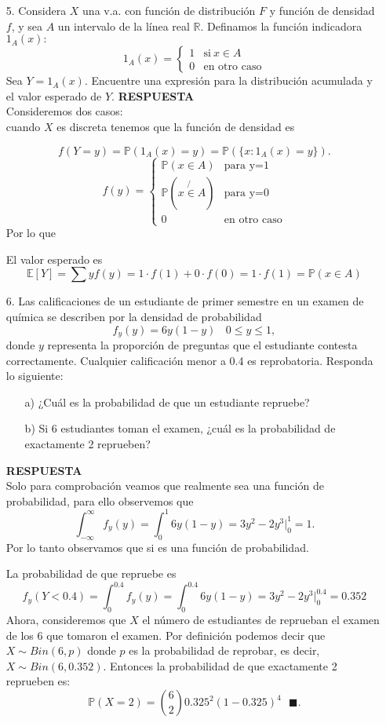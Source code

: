 \documentclass[11pt,letterpaper]{article}
\newcommand{\mP}{\mathbb{P}}
\newcommand{\mE}{\mathbb{E}}
\newcommand{\res}{\textbf{RESPUESTA}\\}
\newcommand{\finf}{\blacksquare.}
\begin{document}
\begin{itemize}
\item[5.] Considera $X$ una v.a. con función de distribución $F$ y función de densidad $f$, y sea $A$ un intervalo de la línea real $\mathbb{R}$. Definamos la función indicadora $1_{A}(x):$
\begin{equation*}
1_{A}(x) = \left\{\begin{array}{ccr}
1 & \text{si} \ x\in A\\
0 & \text{en otro caso}
\end{array}\right.
\end{equation*}
Sea $Y=1_{A}(x).$ Encuentre una expresión para la distribución acumulada y el valor esperado de $Y$. 
\res 
Consideremos dos casos:\\
cuando $X$ es discreta tenemos que la función de densidad es 

$$f(Y=y)=\mP(1_{A}(x)=y)=\mP(\{x:1_{A}(x)=y\}).$$
\begin{equation*}
f(y)=\left\{ \begin{array}{cc}
\mP(x\in A) & \text{para y=1}\\
\mP(x\not{\in} A) & \text{para y=0}\\
0 & \text{en otro caso}
\end{array}\right.
\end{equation*}
Por lo que 

El valor esperado es
$$\mE[Y]=\sum y f(y)=1\cdot f(1)+0\cdot f(0)=1\cdot f(1)=\mP(x\in A)$$

\item[6.] Las calificaciones de un estudiante de primer semestre en un examen de química se describen
por la densidad de probabilidad
$$f_y(y)=6y(1-y)\ \ \ \ 0\leq y \leq 1,$$
donde $y$ representa la proporción de preguntas que el estudiante contesta correctamente. Cualquier calificación menor a 0.4 es reprobatoria. Responda lo siguiente:
\begin{itemize}
\item[a)] ¿Cuál es la probabilidad de que un estudiante repruebe?
\item[b)] Si 6 estudiantes toman el examen, ¿cuál es la probabilidad de exactamente 2 reprueben?
\end{itemize}
\res
Solo para comprobación veamos que realmente sea una función de probabilidad, para ello observemos que
$$\int_{-\infty}^\infty f_y(y)=\int_{0}^1 6y(1-y)=3y^2-2y^3|_0^1=1.$$
Por lo tanto observamos que si es una función de probabilidad. 

La probabilidad de que repruebe es
$$f_y(Y<0.4)=\int_0^{0.4}f_y(y)=\int_0^{0.4} 6y(1-y)=3y^2-2y^3|_0^{0.4}=0.352 $$
Ahora, consideremos que $X$ el número de estudiantes de reprueban el examen de los 6 que tomaron el examen. Por definición podemos decir que $X\sim Bin(6,p)$ donde $p$ es la probabilidad de reprobar, es decir, $X\sim Bin(6,0.352).$  Entonces la probabilidad de que exactamente 2 reprueben es:
$$\mP(X=2)={6\choose 2}0.325^2(1-0.325)^4\ \ \ \finf$$


\end{itemize}
\end{document}
